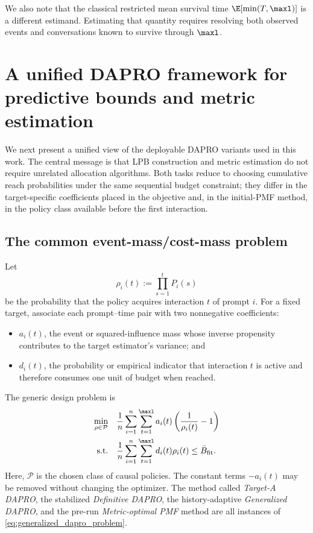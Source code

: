We also note that the classical restricted mean survival time
$\E[\min(T,\maxl)]$ is a different estimand.  Estimating that quantity
requires resolving both observed events and conversations known to survive
through $\maxl$.


\section{A unified DAPRO framework for predictive bounds and metric estimation}
\label{sec:generalized_dapro}

We next present a unified view of the deployable DAPRO variants used in this
work.  The central message is that LPB construction and metric estimation do
not require unrelated allocation algorithms.  Both tasks reduce to choosing
cumulative reach probabilities under the same sequential budget constraint;
they differ in the target-specific coefficients placed in the objective and,
in the initial-PMF method, in the policy class available before the first
interaction.

\subsection{The common event-mass/cost-mass problem}

Let
\begin{equation}
    \rho_i(t):=\prod_{s=1}^{t}P_i(s)
    \label{eq:cumulative_reach_probability}
\end{equation}
be the probability that the policy acquires interaction $t$ of prompt $i$.
For a fixed target, associate each prompt--time pair with two nonnegative
coefficients:
\begin{itemize}
    \item $a_i(t)$, the event or squared-influence mass whose inverse
    propensity contributes to the target estimator's variance; and
    \item $d_i(t)$, the probability or empirical indicator that interaction
    $t$ is active and therefore consumes one unit of budget when reached.
\end{itemize}
The generic design problem is
\begin{equation}
\label{eq:generalized_dapro_problem}
\begin{aligned}
    \min_{\rho\in\mathcal{P}}\quad
    &\frac{1}{n}\sum_{i=1}^{n}\sum_{t=1}^{\maxl}
      a_i(t)\left(\frac{1}{\rho_i(t)}-1\right)\\
    \text{s.t.}\quad
    &\frac{1}{n}\sum_{i=1}^{n}\sum_{t=1}^{\maxl}
      d_i(t)\rho_i(t)\leq\bar B_{\mathrm{fit}}.
\end{aligned}
\end{equation}
Here, $\mathcal{P}$ is the chosen class of causal policies.  The constant
terms $-a_i(t)$ may be removed without changing the optimizer.  The method
called \emph{Target-$A$ DAPRO}, the stabilized \emph{Definitive DAPRO}, the
history-adaptive \emph{Generalized DAPRO}, and the pre-run
\emph{Metric-optimal PMF} method are all instances of
\eqref{eq:generalized_dapro_problem}.

